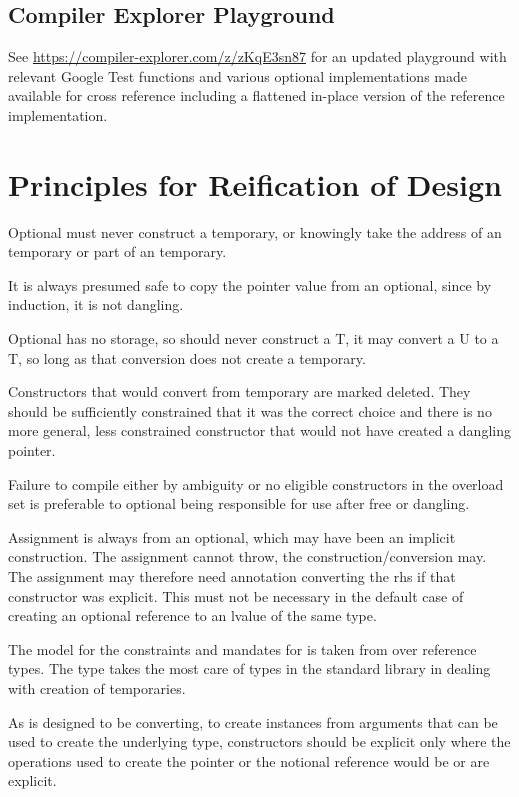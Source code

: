 \documentclass[a4paper,10pt,oneside,openany,final,article]{memoir}
\begin{document}
\section{Compiler Explorer Playground}

See \url{https://compiler-explorer.com/z/zKqE3sn87} for an updated playground with relevant Google Test functions and various optional implementations made available for cross reference including a flattened in-place version of the reference implementation.

\chapter{Principles for Reification of Design}

Optional must never construct a temporary, or knowingly take the address of an temporary or part of an temporary.

It is always presumed safe to copy the pointer value from an optional, since by induction, it is not dangling.

Optional has no storage, so should never construct a T, it may convert a U to a T, so long as that conversion does not create a temporary.

Constructors that would convert from temporary are marked deleted. They should be sufficiently constrained that it was the correct choice and there is no more general, less constrained constructor that would not have created a dangling pointer.

Failure to compile either by ambiguity or no eligible constructors in the overload set is preferable to optional being responsible for use after free or dangling.

Assignment is always from an optional, which may have been an implicit construction. The assignment cannot throw, the construction/conversion may. The assignment may therefore need annotation converting the rhs if that constructor was explicit. This must not be necessary in the default case of creating an optional reference to an lvalue of the same type.

The model for the constraints and mandates for  is taken from  over reference types. The type  takes the most care of types in the standard library in dealing with creation of temporaries.

As  is designed to be converting, to create instances from arguments that can be used to create the underlying type, constructors should be explicit only where the operations used to create the pointer or the notional reference would be or are explicit.
\end{document}

